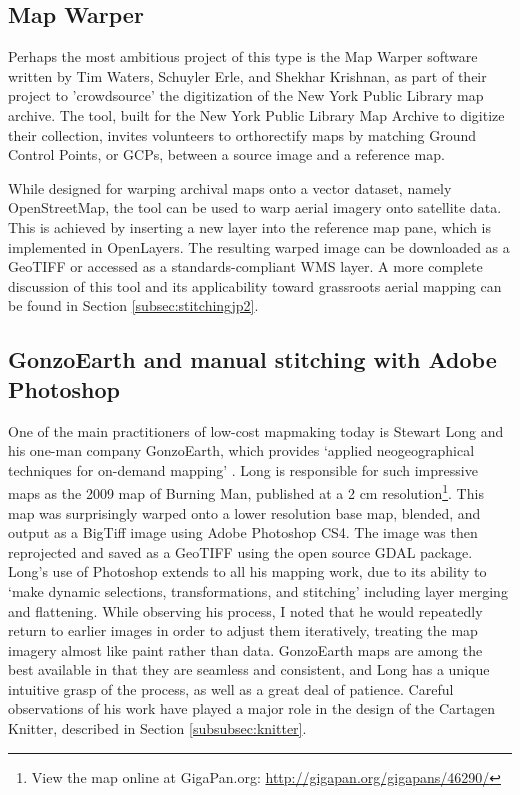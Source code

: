 \documentclass[11pt,oneside,notitlepage]{report}
\begin{document}
\subsection{Map Warper}
\label{subsec:mapwarper}

Perhaps the most ambitious project of this type is the Map Warper software written by Tim Waters, Schuyler Erle, and Shekhar Krishnan, as part of their project to 'crowdsource' the digitization of the New York Public Library map archive. \cite{waters2009warper} The tool, built for the New York Public Library Map Archive to digitize their collection, invites volunteers to orthorectify maps by matching Ground Control Points, or GCPs, between a source image and a reference map. 

While designed for warping archival maps onto a vector dataset, namely OpenStreetMap, the tool can be used to warp aerial imagery onto satellite data. This is achieved by inserting a new layer into the reference map pane, which is implemented in OpenLayers. The resulting warped image can be downloaded as a \ac{GeoTIFF} or accessed as a standards-compliant WMS layer. A more complete discussion of this tool and its applicability toward grassroots aerial mapping can be found in Section \ref{subsec:stitchingjp2}.

\subsection{GonzoEarth and manual stitching with Adobe Photoshop}
\label{subsec:gonzoearth}

One of the main practitioners of low-cost mapmaking today is Stewart Long and his one-man company GonzoEarth, which provides `applied neogeographical techniques for on-demand mapping' \cite{long2010process}. Long is responsible for such impressive maps as the 2009 map of Burning Man, published at a 2 cm resolution\footnote{View the map online at GigaPan.org: \url{http://gigapan.org/gigapans/46290/}}. This map was surprisingly warped onto a lower resolution base map, blended, and output as a BigTiff image using Adobe Photoshop CS4. The image was then reprojected and saved as a \ac{GeoTIFF} using the open source GDAL package. Long's use of Photoshop extends to all his mapping work, due to its ability to `make dynamic selections, transformations, and stitching' including layer merging and flattening. \cite{long2010process} While observing his process, I noted that he would repeatedly return to earlier images in order to adjust them iteratively, treating the map imagery almost like paint rather than data. GonzoEarth maps are among the best available in that they are seamless and consistent, and Long has a unique intuitive grasp of the process, as well as a great deal of patience. Careful observations of his work have played a major role in the design of the Cartagen Knitter, described in Section \ref{subsubsec:knitter}. 
\end{document}
